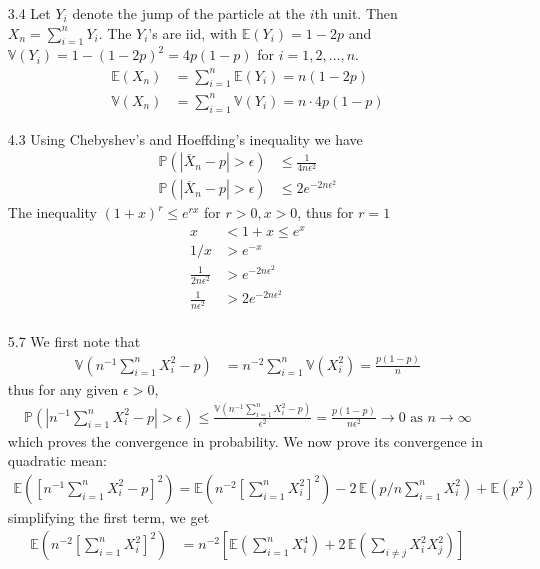 \documentclass[a4paper,10pt]{article}
\theoremstyle{definition}
\begin{document}
\begin{enumerate}
\item[3.4] Let $Y_i$ denote the jump of the particle at the $i$th unit. Then $X_n=\sum_{i=1}^nY_i$. The $Y_i$'s are iid, with $\mathbb{E}(Y_i)=1-2p$ and $\mathbb{V}(Y_i) = 1 - (1-2p)^2 = 4p(1-p)$ for $i=1,2,\ldots, n$.
\begin{align*}
\mathbb{E}(X_n) &= \sum_{i=1}^n\mathbb{E}(Y_i) = n(1-2p)\\
\mathbb{V}(X_n) &= \sum_{i=1}^n\mathbb{V}(Y_i) = n\cdot4p(1-p)
\end{align*}
\item[4.3] Using Chebyshev's and Hoeffding's inequality we have
\begin{align*}
\mathbb{P}(|\overline{X}_n - p|>\epsilon) &\leq \frac{1}{4n \epsilon^2} \\
\mathbb{P}(|\overline{X}_n - p|>\epsilon) &\leq 2e^{-2n\epsilon^2}
\end{align*}
The inequality $(1+x)^r \leq e^{rx}$ for $r>0, x>0$, thus for $r=1$
\begin{align*}
x &< 1 + x \leq e^x\\
1/x &> e^{-x}\\
\frac{1}{2n\epsilon^2} &> e^{-2n\epsilon^2}\\
\frac{1}{n\epsilon^2} &> 2e^{-2n\epsilon^2}\\
\end{align*}
\item[5.7] We first note that 
\begin{align*}
\mathbb{V}\left(n^{-1}\sum_{i=1}^{n}X_i^2-p\right) & = n^{-2}\sum_{i=1}^{n}\mathbb{V}(X_i^2) = \frac{p(1-p)}{n}
\end{align*}
thus for any given $\epsilon >0$,
\begin{align*}
\mathbb{P}\left(|n^{-1}\sum_{i=1}^{n}X_i^2-p|>\epsilon\right)\leq \frac{\mathbb{V}(n^{-1}\sum_{i=1}^{n}X_i^2-p)}{\epsilon^2}=\frac{p(1-p)}{n\epsilon^2} \to 0 \text{ as } n \to \infty
\end{align*}
which proves the convergence in probability. We now prove its convergence in quadratic mean:
\begin{align}
\mathbb{E}\left(\left[n^{-1}\sum_{i=1}^{n}X_i^2-p \right]^2\right) = \mathbb{E}\left(n^{-2}\left[\sum_{i=1}^{n}X_i^2\right]^2\right)-2\,\mathbb{E}\left(p/n\sum_{i=1}^{n}X_i^2\right)+\mathbb{E}\left(p^2\right)\label{eq}
\end{align}
simplifying the first term, we get
\begin{align*}
\mathbb{E}\left(n^{-2}\left[\sum_{i=1}^{n}X_i^2\right]^2\right) &= n^{-2}\left[\mathbb{E}\left(\sum_{i=1}^{n}X_i^4\right)+2\,\mathbb{E}\left(\sum_{i\neq j}X_i^2X_j^2\right)\right]\\

\end{align*}
\end{enumerate}
\end{document}
